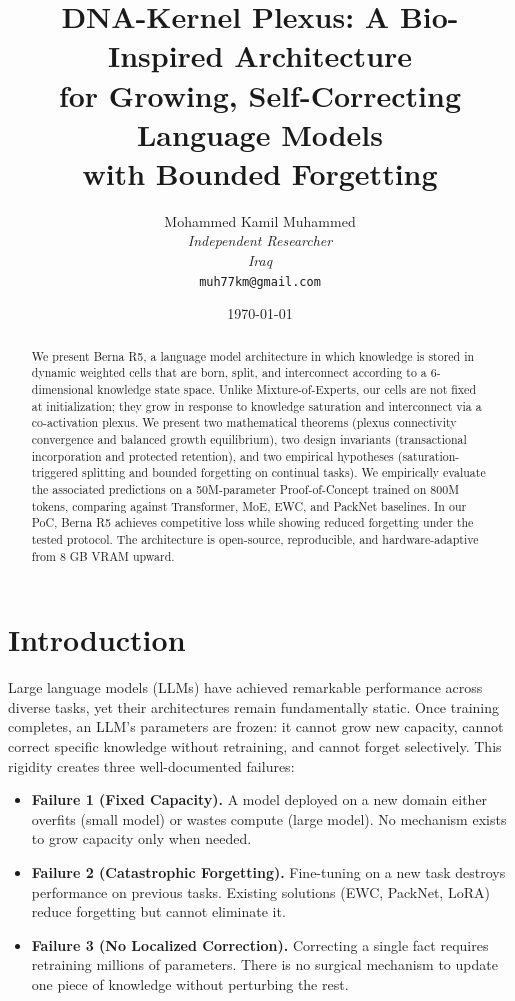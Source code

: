 \documentclass[11pt,a4paper]{article}
\title{\textbf{DNA-Kernel Plexus: A Bio-Inspired Architecture\\
for Growing, Self-Correcting Language Models\\
with Bounded Forgetting}}
\author{
    Mohammed Kamil Muhammed\\
    \textit{Independent Researcher}\\
    \textit{Iraq}\\
    \texttt{muh77km@gmail.com}
}
\date{\today}
\begin{document}
\maketitle

\begin{abstract}
We present Berna R5, a language model architecture in which
knowledge is stored in dynamic weighted cells that are born,
split, and interconnect according to a 6-dimensional
knowledge state space. Unlike Mixture-of-Experts, our
cells are not fixed at initialization; they grow in response
to knowledge saturation and interconnect via a co-activation
plexus. We present two mathematical theorems (plexus connectivity convergence and balanced growth equilibrium), two design invariants (transactional incorporation and protected retention), and two empirical hypotheses (saturation-triggered splitting and bounded forgetting on continual tasks). We empirically evaluate the associated predictions on a
50M-parameter Proof-of-Concept trained on 800M tokens,
comparing against Transformer, MoE, EWC, and PackNet
baselines. In our PoC, Berna R5 achieves competitive loss while
showing reduced forgetting under the tested protocol. The architecture is
open-source, reproducible, and hardware-adaptive from 8 GB
VRAM upward.
\end{abstract}

\tableofcontents

\newpage

\section{Introduction}
\label{sec:intro}

Large language models (LLMs) have achieved remarkable
performance across diverse tasks, yet their architectures
remain fundamentally static. Once training completes, an
LLM's parameters are frozen: it cannot grow new capacity,
cannot correct specific knowledge without retraining,
and cannot forget selectively. This rigidity creates three
well-documented failures:

\begin{itemize}
    \item \textbf{Failure 1 (Fixed Capacity).} A model deployed
    on a new domain either overfits (small model) or wastes
    compute (large model). No mechanism exists to grow capacity
    only when needed.
    \item \textbf{Failure 2 (Catastrophic Forgetting).}
    Fine-tuning on a new task destroys performance on previous
    tasks. Existing solutions (EWC, PackNet, LoRA) reduce
    forgetting but cannot eliminate it.
    \item \textbf{Failure 3 (No Localized Correction).}
    Correcting a single fact requires retraining millions of
    parameters. There is no surgical mechanism to update one
    piece of knowledge without perturbing the rest.
\end{itemize}
\end{document}
